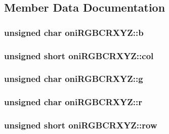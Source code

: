 \subsection{Member Data Documentation}
\hypertarget{structoni_r_g_b_c_r_x_y_z_a5441379b45133c8d2db7dc4d7e04a1bb}{
\subsubsection[{b}]{\setlength{\rightskip}{0pt plus 5cm}unsigned char oni\-R\-G\-B\-C\-R\-X\-Y\-Z\-::b}}\label{structoni_r_g_b_c_r_x_y_z_a5441379b45133c8d2db7dc4d7e04a1bb}
\hypertarget{structoni_r_g_b_c_r_x_y_z_a66042f0ffba0616df5098f0ae276ed57}{
\subsubsection[{col}]{\setlength{\rightskip}{0pt plus 5cm}unsigned short oni\-R\-G\-B\-C\-R\-X\-Y\-Z\-::col}}\label{structoni_r_g_b_c_r_x_y_z_a66042f0ffba0616df5098f0ae276ed57}
\hypertarget{structoni_r_g_b_c_r_x_y_z_ad205110931dbbf0fda04e3b0ad2e26bd}{
\subsubsection[{g}]{\setlength{\rightskip}{0pt plus 5cm}unsigned char oni\-R\-G\-B\-C\-R\-X\-Y\-Z\-::g}}\label{structoni_r_g_b_c_r_x_y_z_ad205110931dbbf0fda04e3b0ad2e26bd}
\hypertarget{structoni_r_g_b_c_r_x_y_z_ab548d9d2d77446ba839124630eba4cd1}{
\subsubsection[{r}]{\setlength{\rightskip}{0pt plus 5cm}unsigned char oni\-R\-G\-B\-C\-R\-X\-Y\-Z\-::r}}\label{structoni_r_g_b_c_r_x_y_z_ab548d9d2d77446ba839124630eba4cd1}
\hypertarget{structoni_r_g_b_c_r_x_y_z_aaee0318f6df1fcc2e70f641d1f603d90}{
\subsubsection[{row}]{\setlength{\rightskip}{0pt plus 5cm}unsigned short oni\-R\-G\-B\-C\-R\-X\-Y\-Z\-::row}}\label{structoni_r_g_b_c_r_x_y_z_aaee0318f6df1fcc2e70f641d1f603d90}
